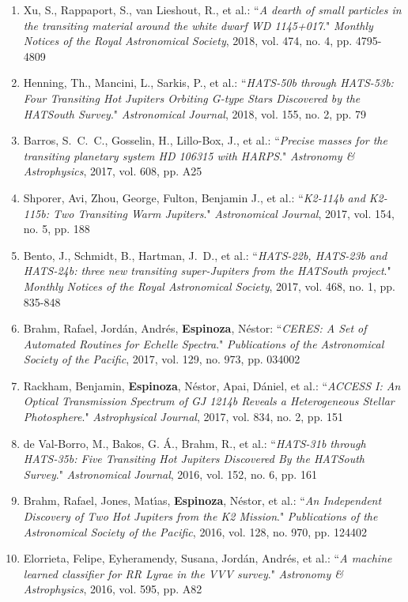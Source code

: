 \documentclass[12pt, a4paper]{article} %
\begin{document}
\begin{flushleft}
\begin{enumerate}
\item Xu, S., Rappaport, S., van Lieshout, R., et al.: ``\textit{A dearth of small particles in the transiting material around the white dwarf WD 1145+017}." \textit{Monthly Notices of the Royal Astronomical Society}, 2018, vol. 474, no. 4, pp. 4795-4809
\item Henning, Th., Mancini, L., Sarkis, P., et al.: ``\textit{HATS-50b through HATS-53b: Four Transiting Hot Jupiters Orbiting G-type Stars Discovered by the HATSouth Survey}." \textit{Astronomical Journal}, 2018, vol. 155, no. 2, pp. 79
\item Barros, S.~C.~C., Gosselin, H., Lillo-Box, J., et al.: ``\textit{Precise masses for the transiting planetary system HD 106315 with HARPS}." \textit{Astronomy \& Astrophysics}, 2017, vol. 608, pp. A25
\item Shporer, Avi, Zhou, George, Fulton, Benjamin J., et al.: ``\textit{K2-114b and K2-115b: Two Transiting Warm Jupiters}." \textit{Astronomical Journal}, 2017, vol. 154, no. 5, pp. 188
\item Bento, J., Schmidt, B., Hartman, J.~D., et al.: ``\textit{HATS-22b, HATS-23b and HATS-24b: three new transiting super-Jupiters from the HATSouth project}." \textit{Monthly Notices of the Royal Astronomical Society}, 2017, vol. 468, no. 1, pp. 835-848
\item Brahm, Rafael, Jordán, Andrés, \textbf{Espinoza}, Néstor: ``\textit{CERES: A Set of Automated Routines for Echelle Spectra}." \textit{Publications of the Astronomical Society of the Pacific}, 2017, vol. 129, no. 973, pp. 034002
\item Rackham, Benjamin, \textbf{Espinoza}, Néstor, Apai, Dániel, et al.: ``\textit{ACCESS I: An Optical Transmission Spectrum of GJ 1214b Reveals a Heterogeneous Stellar Photosphere}." \textit{Astrophysical Journal}, 2017, vol. 834, no. 2, pp. 151
\item de Val-Borro, M., Bakos, G. Á., Brahm, R., et al.: ``\textit{HATS-31b through HATS-35b: Five Transiting Hot Jupiters Discovered By the HATSouth Survey}." \textit{Astronomical Journal}, 2016, vol. 152, no. 6, pp. 161
\item Brahm, Rafael, Jones, Matı́as, \textbf{Espinoza}, Néstor, et al.: ``\textit{An Independent Discovery of Two Hot Jupiters from the K2 Mission}." \textit{Publications of the Astronomical Society of the Pacific}, 2016, vol. 128, no. 970, pp. 124402
\item Elorrieta, Felipe, Eyheramendy, Susana, Jordán, Andrés, et al.: ``\textit{A machine learned classifier for RR Lyrae in the VVV survey}." \textit{Astronomy \& Astrophysics}, 2016, vol. 595, pp. A82

\end{enumerate}
\end{flushleft}
\end{document}
